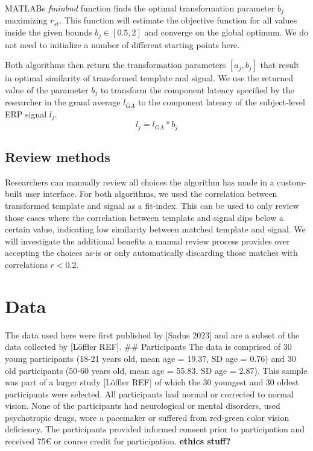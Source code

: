 \documentclass[
  man,floatsintext]{apa7}
\begin{document}
MATLABs \emph{fminbnd} function finds the optimal transformation parameter \(b_j\) maximizing \(r_{st}\). This function will estimate the objective function for all values inside the given bounds \(b_j \in [0.5, 2]\) and converge on the global optimum. We do not need to initialize a number of different starting points here.

Both algorithms then return the transformation parameters \([a_j, b_j]\) that result in optimal similarity of transformed template and signal. We use the returned value of the parameter \(b_j\) to transform the component latency specified by the researcher in the grand average \(l_{GA}\) to the component latency of the subject-level ERP signal \(l_j\).
\[ l_j = l_{GA} * b_j \]

\hypertarget{review-methods}{%
\subsection{Review methods}\label{review-methods}}

Researchers can manually review all choices the algorithm has made in a custom-built user interface. For both algorithms, we used the correlation between transformed template and signal as a fit-index. This can be used to only review those cases where the correlation between template and signal dips below a certain value, indicating low similarity between matched template and signal. We will investigate the additional benefits a manual review process provides over accepting the choices as-is or only automatically discarding those matches with correlations \(r < 0.2\).

\hypertarget{data}{%
\section{Data}\label{data}}

The data used here were first published by {[}Sadus 2023{]} and are a subset of the data collected by {[}Löffler REF{]}.
\#\# Participants
The data is comprised of 30 young participants (18-21 years old, mean age = 19.37, SD age = 0.76) and 30 old participants (50-60 years old, mean age = 55.83, SD age = 2.87). This sample was part of a larger study {[}Löffler REF{]} of which the 30 youngest and 30 oldest participants were selected. All participants had normal or corrected to normal vision. None of the participants had neurological or mental disorders, used psychotropic drugs, wore a pacemaker or suffered from red-green color vision deficiency. The participants provided informed consent prior to participation and received 75€ or course credit for participation. \textbf{ethics stuff?}
\end{document}
